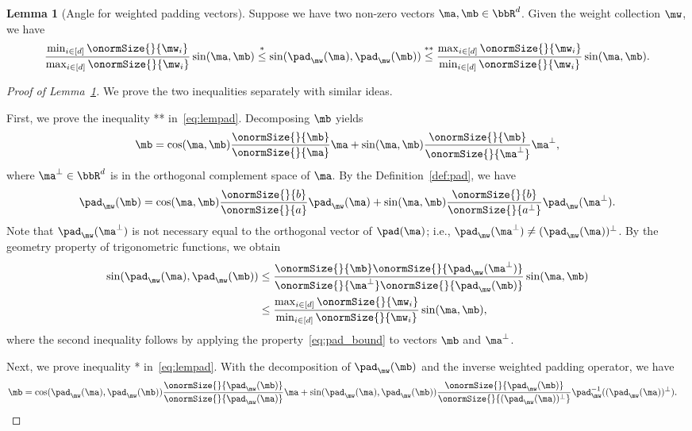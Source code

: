 \documentclass[lettersize,onecolumn,journal]{IEEEtran}
\theoremstyle{definition}
\newtheorem{lem}{Lemma}
\theoremstyle{definition}
\begin{document}
\begin{lem}[Angle for weighted padding vectors]\label{lem:pad} Suppose we have two non-zero vectors $\ma, \mb \in \bbR^d$. Given the weight collection $\mw$, we have 
\begin{equation}\label{eq:lempad}
   \frac{\min_{i \in [d]} \onormSize{}{\mw_i}}{\max_{i \in [d]} \onormSize{}{\mw_i} } \sin (\ma, \mb) \stackrel{*}{\leq} \sin(\pad_{\mw}(\ma),  \pad_{\mw}(\mb)) \stackrel{**}{\leq} \frac{ \max_{i \in [d]} \onormSize{}{\mw_i} }{\min_{i \in [d]} \onormSize{}{\mw_i}} \sin (\ma, \mb).
\end{equation}
\end{lem}

\begin{proof}[Proof of Lemma~\ref{lem:pad}] We prove the two inequalities separately with similar ideas.

First, we prove the inequality ** in~\eqref{eq:lempad}. Decomposing $\mb$ yields
\begin{equation}
    \mb = \cos (\ma, \mb) \frac{\onormSize{}{\mb}}{\onormSize{}{\ma}} \ma + \sin (\ma, \mb) \frac{\onormSize{}{\mb}}{\onormSize{}{\ma^{\perp}}}\ma^{\perp},
\end{equation}
where $\ma^{\perp} \in \bbR^d$ is in the orthogonal complement space of $\ma$. By the Definition~\ref{def:pad}, we have 
\begin{equation}\label{eq:pad_second_ineq}
    \pad_{\mw}(\mb) = \cos (\ma, \mb) \frac{\onormSize{}{b}}{\onormSize{}{a}} \pad_{\mw}(\ma) + \sin (\ma, \mb) \frac{\onormSize{}{b}}{\onormSize{}{a^{\perp}}} \pad_{\mw}(\ma^{\perp}).
\end{equation}
Note that $\pad_{\mw}(\ma^{\perp})$ is not necessary equal to the orthogonal vector of $\pad(\ma)$; i.e., $\pad_{\mw}(\ma^{\perp}) \neq (\pad_{\mw}(\ma))^{\perp}$. By the geometry property of trigonometric functions, we obtain
\begin{align}
    \sin(\pad_{\mw}(\ma),  \pad_{\mw}(\mb))  &\leq \frac{  \onormSize{}{\mb} \onormSize{}{\pad_{\mw}(\ma^{\perp})} }{ \onormSize{}{\ma^{\perp}} \onormSize{}{ \pad_{\mw}(\mb)}} \sin (\ma, \mb)  \\
    & \leq  \frac{ \max_{i \in [d]} \onormSize{}{\mw_i} }{\min_{i \in [d]} \onormSize{}{\mw_i}} \sin (\ma, \mb),
\end{align}
where the second inequality follows by applying the property~\eqref{eq:pad_bound} to vectors $\mb$ and $\ma^{\perp}$. 

Next, we prove inequality * in~\eqref{eq:lempad}. With the decomposition of $\pad_{\mw}(\mb)$ and the inverse weighted padding operator, we have 
\begin{align}
    \mb &=  \cos(\pad_{\mw}(\ma), \pad_{\mw}(\mb)) \frac{\onormSize{}{\pad_{\mw}(\mb)}}{\onormSize{}{\pad_{\mw}(\ma)}} \ma +  \sin(\pad_{\mw}(\ma), \pad_{\mw}(\mb))\frac{\onormSize{}{\pad_{\mw}(\mb)}}{\onormSize{}{(\pad_{\mw}(\ma))^{\perp}}} \pad_{\mw}^{-1}((\pad_{\mw}(\ma))^{\perp}).
\end{align}


\end{proof}
\end{document}
